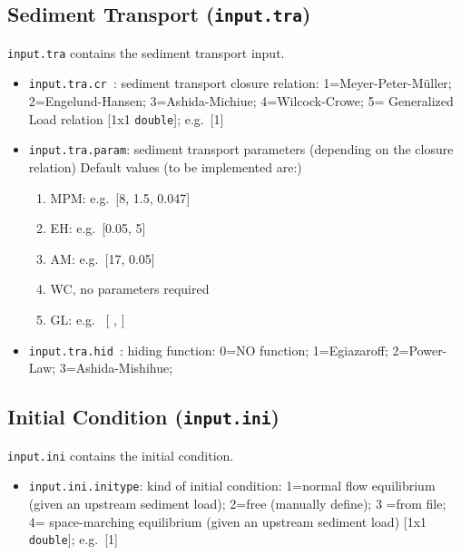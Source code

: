 \documentclass[a4paper, 11pt]{article}
\begin{document}
\subsection{Sediment Transport (\texttt{input.tra})}
\label{subsubsec:in_tra}
%
\texttt{input.tra} contains the sediment transport input.
\begin{itemize}
\item \texttt{input.tra.cr   }: sediment transport closure relation: 1=Meyer-Peter-M\"uller; 2=Engelund-Hansen; 3=Ashida-Michiue; 4=Wilcock-Crowe; 5= Generalized Load relation [1x1 \texttt{double}]; e.g.\ [1]
\item \texttt{input.tra.param}: sediment transport parameters (depending on the closure relation) Default values (to be implemented are:)
\begin{enumerate}
\item MPM: e.g.\ [8, 1.5, 0.047]
\item EH: e.g.\ [0.05, 5] 
\item AM: e.g.\ [17, 0.05]
\item WC, no parameters required
\item GL: e.g. \ [ , ]
\end{enumerate}
\item \texttt{input.tra.hid  }: hiding function: 0=NO function; 1=Egiazaroff; 2=Power-Law; 3=Ashida-Mishihue;
\end{itemize}

%
\subsection{Initial Condition (\texttt{input.ini})}
\label{subsubsec:in_ini}
%
\texttt{input.ini} contains the initial condition.
\begin{itemize}
\item \texttt{input.ini.initype}: kind of initial condition: 1=normal flow equilibrium (given an upstream sediment load); 2=free (manually define); 3 =from file; 4= space-marching equilibrium (given an upstream sediment load) [1x1 \texttt{double}]; e.g.\ [1]
\end{itemize}
\end{document}

